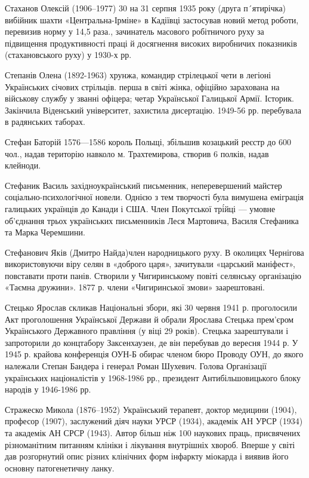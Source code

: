 Стаханов Олексій (1906–1977) 30 на 31 серпня 1935 року (друга п´ятирічка) вибійник шахти «Центральна-Ірміне» в Кадіївці застосував новий метод роботи, перевизив норму у 14,5 раза., зачинатель масового робітничого руху за підвищення продуктивності праці й досягнення високих виробничих показників (стахановського руху) у 1930-х рр.

Степанів Олена (1892-1963) хрунжа,  командир стрілецької чети в легіоні Українських січових стрільців. перша в світі жінка, офіційно зарахована на військову службу у званні офіцера; четар Української Галицької Армії. Історик. Закінчила Віденський університет, захистила дисертацію. 1949-56 рр. перебувала в радянських таборах.

Стефан Баторій 1576—1586 король Польщі, збільшив козацький реєстр до 600 чол., надав територію навколо м. Трахтемирова, створив 6 полків, надав клейноди.

Стефаник Василь західноукраїнський письменник, неперевершений майстер соціально-психологічної новели. Однією з тем творчості була вимушена еміграція галицьких українців до Канади і США. Член Покутської трі́йці — умовне об'єднання трьох українських письменників Леся Мартовича, Василя Стефаника та Марка Черемшини.  

Стефанович Яків (Дмитро Найда)член народницького руху. В околицях Чернігова використовуючи віру селян в «доброго царя»,  зачитували «царський маніфест», повставати проти панів. Створили у Чигиринському повіті селянську організацію «Таємна дружини». 1877 р. члени «Чигиринської змови» заарештовані.  

Стецько Ярослав скликав Національні збори, які 30 червня 1941 р. проголосили Акт проголошення Української Держави й обрали Ярослава Стецька прем'єром Українського Державного правління (у віці 29 років). Стецька заарештували і запроторили до концтабору Заксенхаузен, де він перебував до вересня 1944 р. У 1945 р. крайова конференція ОУН-Б обирає членом бюро Проводу ОУН, до якого належали Степан Бандера і генерал Роман Шухевич. Голова Організації українських націоналістів у 1968-1986 рр., президент Антибільшовицького блоку народів у 1946-1986 рр.

Стражеско Микола (1876–1952) Український терапевт, доктор медицини (1904), професор (1907), заслужений діяч науки УРСР (1934), академік АН УРСР (1934) та академік АН СРСР (1943). Автор більш ніж 100 наукових праць, присвячених різноманітним питанням клініки і лікування внутрішніх хвороб. Вперше у світі дав розгорнутий опис різних клінічних форм інфаркту міокарда і виявив його основну патогенетичну ланку.

